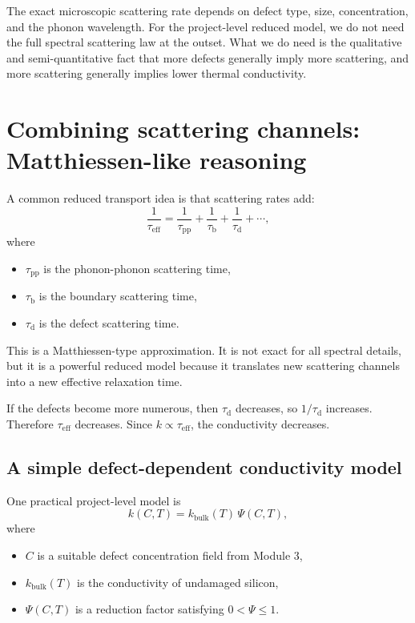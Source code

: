 \documentclass[11pt]{article}
\begin{document}
The exact microscopic scattering rate depends on defect type, size, concentration, and the phonon wavelength. For the project-level reduced model, we do not need the full spectral scattering law at the outset. What we do need is the qualitative and semi-quantitative fact that more defects generally imply more scattering, and more scattering generally implies lower thermal conductivity.

\section{Combining scattering channels: Matthiessen-like reasoning}

A common reduced transport idea is that scattering rates add:
\[
\frac{1}{\tau_{\mathrm{eff}}} = \frac{1}{\tau_{\mathrm{pp}}} + \frac{1}{\tau_{\mathrm{b}}} + \frac{1}{\tau_{\mathrm{d}}} + \cdots,
\]
where
\begin{itemize}
    \item $\tau_{\mathrm{pp}}$ is the phonon-phonon scattering time,
    \item $\tau_{\mathrm{b}}$ is the boundary scattering time,
    \item $\tau_{\mathrm{d}}$ is the defect scattering time.
\end{itemize}

This is a Matthiessen-type approximation. It is not exact for all spectral details, but it is a powerful reduced model because it translates new scattering channels into a new effective relaxation time.

If the defects become more numerous, then $\tau_{\mathrm{d}}$ decreases, so $1/\tau_{\mathrm{d}}$ increases. Therefore $\tau_{\mathrm{eff}}$ decreases. Since $k\propto \tau_{\mathrm{eff}}$, the conductivity decreases.

\subsection{A simple defect-dependent conductivity model}

One practical project-level model is
\[
 k(C,T) = k_{\mathrm{bulk}}(T)\, \Psi(C,T),
\]
where
\begin{itemize}
    \item $C$ is a suitable defect concentration field from Module 3,
    \item $k_{\mathrm{bulk}}(T)$ is the conductivity of undamaged silicon,
    \item $\Psi(C,T)$ is a reduction factor satisfying $0<\Psi\le 1$.
\end{itemize}
\end{document}
